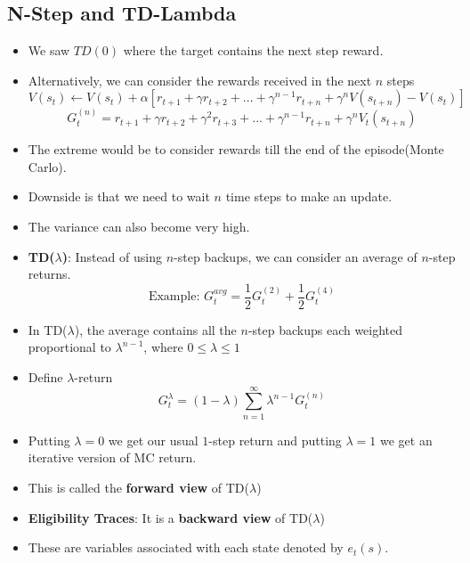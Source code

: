 \documentclass[a4paper]{article}
\begin{document}
\subsection{N-Step and TD-Lambda}
\begin{itemize}
    \item We saw $TD(0)$ where the target contains the next step reward.
    \item Alternatively, we can consider the rewards received in the next $n$ steps
    \begin{equation*}
        V(s_t)\gets V(s_t)+\alpha[r_{t+1}+\gamma r_{t+2}+...+\gamma^{n-1}r_{t+n}+\gamma^nV(s_{t+n})-V(s_t)]
    \end{equation*}
    \begin{equation*}
        G_t^{(n)}=r_{t+1}+\gamma r_{t+2}+\gamma^2r_{t+3}+...+\gamma^{n-1}r_{t+n}+\gamma^nV_t(s_{t+n})
    \end{equation*}
    \item The extreme would be to consider rewards till the end of the episode(Monte Carlo).
    \item Downside is that we need to wait $n$ time steps to make an update.
    \item The variance can also become very high.
    \item \textbf{TD($\lambda$)}: Instead of using $n$-step backups, we can consider an average of $n$-step returns.
    \begin{equation*}
        \text{Example: }G_t^{avg}=\frac{1}{2}G_t^{(2)}+\frac{1}{2}G_t^{(4)}
    \end{equation*}
    \item In TD($\lambda$), the average contains all the $n$-step backups each weighted proportional to $\lambda^{n-1}$, where $0\leq \lambda \leq 1$
    \item Define $\lambda$-return
    \begin{equation*}
        G_t^\lambda=(1-\lambda)\sum_{n=1}^\infty \lambda^{n-1}G_t^{(n)}
    \end{equation*}
    \item Putting $\lambda=0$ we get our usual $1$-step return and putting $\lambda=1$ we get an iterative version of MC return.
    \item This is called the \textbf{forward view} of TD($\lambda$)
    \item \textbf{Eligibility Traces}: It is a \textbf{backward view} of TD($\lambda$)
    \item These are variables associated with each state denoted by $e_t(s)$.

\end{itemize}
\end{document}
